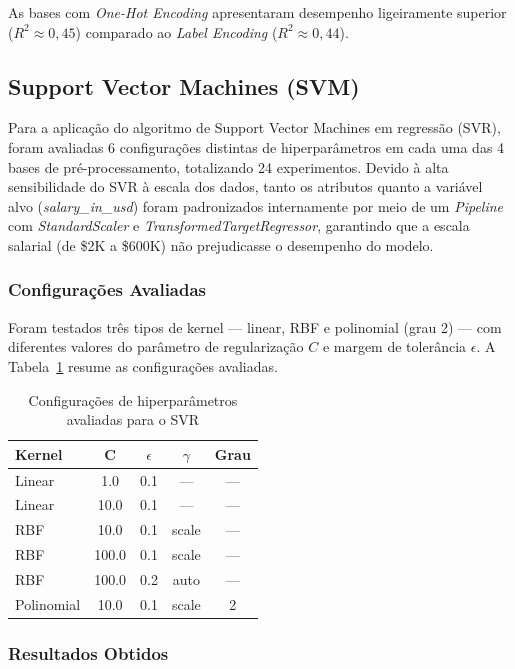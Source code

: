 \documentclass[12pt]{article}
\begin{document}
As bases com \textit{One-Hot Encoding} apresentaram desempenho ligeiramente superior ($R^2 \approx 0{,}45$) comparado ao \textit{Label Encoding} ($R^2 \approx 0{,}44$).


\subsection{Support Vector Machines (SVM)}

Para a aplicação do algoritmo de Support Vector Machines em regressão (SVR), foram avaliadas 6 configurações distintas de hiperparâmetros em cada uma das 4 bases de pré-processamento, totalizando 24 experimentos. Devido à alta sensibilidade do SVR à escala dos dados, tanto os atributos quanto a variável alvo (\textit{salary\_in\_usd}) foram padronizados internamente por meio de um \textit{Pipeline} com \textit{StandardScaler} e \textit{TransformedTargetRegressor}, garantindo que a escala salarial (de \$2K a \$600K) não prejudicasse o desempenho do modelo.

\subsubsection{Configurações Avaliadas}

Foram testados três tipos de kernel --- linear, RBF e polinomial (grau 2) --- com diferentes valores do parâmetro de regularização $C$ e margem de tolerância $\epsilon$. A Tabela~\ref{tab:svm_configs} resume as configurações avaliadas.

\begin{table}[H]
\centering
\caption{Configurações de hiperparâmetros avaliadas para o SVR}
\label{tab:svm_configs}
\begin{tabular}{|l|c|c|c|c|}
\hline
\textbf{Kernel} & \textbf{C} & \textbf{$\epsilon$} & \textbf{$\gamma$} & \textbf{Grau} \\ \hline
Linear & 1.0 & 0.1 & --- & --- \\ \hline
Linear & 10.0 & 0.1 & --- & --- \\ \hline
RBF & 10.0 & 0.1 & scale & --- \\ \hline
RBF & 100.0 & 0.1 & scale & --- \\ \hline
RBF & 100.0 & 0.2 & auto & --- \\ \hline
Polinomial & 10.0 & 0.1 & scale & 2 \\ \hline
\end{tabular}
\end{table}

\subsubsection{Resultados Obtidos}
\end{document}
